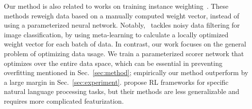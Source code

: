 Our method is also related to works on training instance weighting~\citep{importance_weight,learn_reweight,jiang-zhai-2007-instance,domain_adapt_transfer}. These methods reweigh data based on a manually computed weight vector, instead of using a parameterized neural network.
Notably,~\citet{learn_reweight} tackles noisy data filtering for image classification, by using meta-learning to calculate a locally optimized weight vector for each batch of data.
In contrast, our work focuses on the general problem of optimizing data usage. We train a parameterized scorer network that optimizes over the entire data space, which can be essential in preventing overfitting mentioned in Sec.~\ref{sec:method};  empirically our method outperform \cite{learn_reweight} by a large margin in Sec.~\ref{sec:experiment}.
\citep{reinforce_cotrain,rl_nmt,learn_active_learn} propose RL frameworks for specific natural language processing tasks, but their methods are less generalizable and requires more complicated featurization.   











